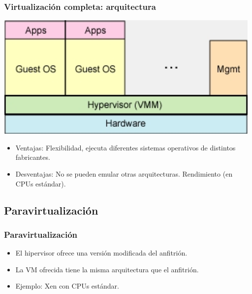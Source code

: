 \documentclass{beamer}
\begin{document}
\begin{frame}
\frametitle{Virtualización completa: arquitectura}
\begin{center}
\includegraphics[scale=0.35,clip=false]{figs/fullvirt.png}
\end{center}

\begin{itemize}
\item \alert{Ventajas:} Flexibilidad, ejecuta diferentes sistemas operativos de distintos fabricantes.
\item \alert{Desventajas:} No se pueden emular otras arquitecturas. Rendimiento (en CPUs estándar).
\end{itemize}


\end{frame}


\subsection{Paravirtualización}

\begin{frame}
\frametitle{Paravirtualización}

\begin{itemize}
\item El hipervisor ofrece una versión modificada del anfitrión.
\item La VM ofrecida tiene la misma arquitectura que el anfitrión.
\item \alert{Ejemplo:} Xen con CPUs estándar.
\end{itemize}
\end{frame}
\end{document}
